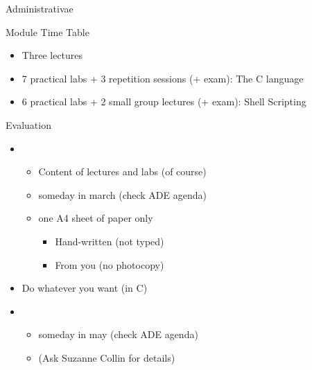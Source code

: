 \begin{frame}{Administrativae}
  \begin{block}{Module Time Table}
    \begin{itemize}
    \item Three lectures
    \item 7 practical labs + 3 repetition sessions (+ exam): The C language 
    \item 6 practical labs + 2 small group lectures (+ exam): Shell Scripting
    \end{itemize}
  \end{block}
  \begin{block}{Evaluation}
    \begin{itemize}
    \item {}
      \begin{itemize}
      \item {} Content of lectures and labs (of course)
      \item {} someday in march (check ADE agenda)
      \item {} one A4 sheet of paper only
        \begin{itemize}
        \item Hand-written (not typed)
        \item From you (no photocopy)
        \end{itemize}
      \end{itemize}
    \item {} Do whatever you want (in C)
    \item {}\\
      \begin{itemize}
      \item {} someday in may (check ADE agenda)
      \item (Ask Suzanne Collin for details)
      \end{itemize}
    \end{itemize}
  \end{block}
\end{frame}
